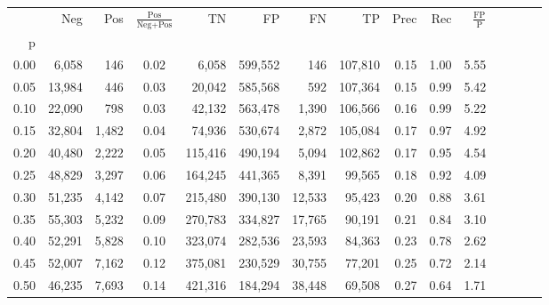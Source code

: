 \begin{tabular}{rrrcrrrrrrrrrrr}
\toprule
{} &     Neg &    Pos & $\frac{\text{Pos}}{\text{Neg}+\text{Pos}}$ &       TN &       FP &       FN &       TP &  Prec &   Rec & $\frac{\text{FP}}{\text{P}}$ \\
p    &         &        &                                            &          &          &          &          &       &       &                              \\
\midrule
0.00 &   6,058 &    146 &                                       0.02 &    6,058 &  599,552 &      146 &  107,810 &  0.15 &  1.00 &                         5.55 \\
0.05 &  13,984 &    446 &                                       0.03 &   20,042 &  585,568 &      592 &  107,364 &  0.15 &  0.99 &                         5.42 \\
0.10 &  22,090 &    798 &                                       0.03 &   42,132 &  563,478 &    1,390 &  106,566 &  0.16 &  0.99 &                         5.22 \\
0.15 &  32,804 &  1,482 &                                       0.04 &   74,936 &  530,674 &    2,872 &  105,084 &  0.17 &  0.97 &                         4.92 \\
0.20 &  40,480 &  2,222 &                                       0.05 &  115,416 &  490,194 &    5,094 &  102,862 &  0.17 &  0.95 &                         4.54 \\
0.25 &  48,829 &  3,297 &                                       0.06 &  164,245 &  441,365 &    8,391 &   99,565 &  0.18 &  0.92 &                         4.09 \\
0.30 &  51,235 &  4,142 &                                       0.07 &  215,480 &  390,130 &   12,533 &   95,423 &  0.20 &  0.88 &                         3.61 \\
0.35 &  55,303 &  5,232 &                                       0.09 &  270,783 &  334,827 &   17,765 &   90,191 &  0.21 &  0.84 &                         3.10 \\
0.40 &  52,291 &  5,828 &                                       0.10 &  323,074 &  282,536 &   23,593 &   84,363 &  0.23 &  0.78 &                         2.62 \\
0.45 &  52,007 &  7,162 &                                       0.12 &  375,081 &  230,529 &   30,755 &   77,201 &  0.25 &  0.72 &                         2.14 \\
0.50 &  46,235 &  7,693 &                                       0.14 &  421,316 &  184,294 &   38,448 &   69,508 &  0.27 &  0.64 &                         1.71 \\

\end{tabular}

